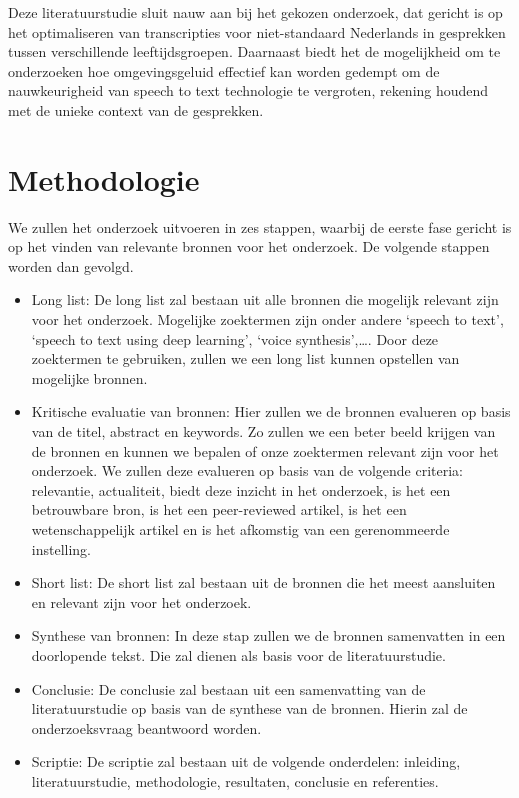 Deze literatuurstudie sluit nauw aan bij het gekozen onderzoek, dat gericht is op het optimaliseren van transcripties voor niet-standaard Nederlands in gesprekken tussen verschillende leeftijdsgroepen. Daarnaast biedt het de mogelijkheid om te onderzoeken hoe omgevingsgeluid effectief kan worden gedempt om de nauwkeurigheid van speech to text technologie te vergroten, rekening houdend met de unieke context van de gesprekken.

\section{Methodologie}%
\label{sec:methodologie}

We zullen het onderzoek uitvoeren in zes stappen, waarbij de eerste fase gericht is op het vinden van relevante bronnen voor het onderzoek. De volgende stappen worden dan gevolgd.

\begin{itemize}
    \item Long list: De long list zal bestaan uit alle bronnen die mogelijk relevant zijn voor het onderzoek. Mogelijke zoektermen zijn onder andere `speech to text', `speech to text using deep learning', `voice synthesis',\dots. Door deze zoektermen te gebruiken, zullen we een long list kunnen opstellen van mogelijke bronnen.
    \item Kritische evaluatie van bronnen: Hier zullen we de bronnen evalueren op basis van de titel, abstract en keywords. Zo zullen we een beter beeld krijgen van de bronnen en kunnen we bepalen of onze zoektermen relevant zijn voor het onderzoek. We zullen deze evalueren op basis van de volgende criteria: relevantie, actualiteit, biedt deze inzicht in het onderzoek, is het een betrouwbare bron, is het een peer-reviewed artikel, is het een wetenschappelijk artikel en is het afkomstig van een gerenommeerde instelling.
    \item Short list: De short list zal bestaan uit de bronnen die het meest aansluiten en relevant zijn voor het onderzoek.
    \item Synthese van bronnen: In deze stap zullen we de bronnen samenvatten in een doorlopende tekst. Die zal dienen als basis voor de literatuurstudie.
    \item Conclusie: De conclusie zal bestaan uit een samenvatting van de literatuurstudie op basis van de synthese van de bronnen. Hierin zal de onderzoeksvraag beantwoord worden.
    \item Scriptie: De scriptie zal bestaan uit de volgende onderdelen: inleiding, literatuurstudie, methodologie, resultaten, conclusie en referenties.
\end{itemize}

